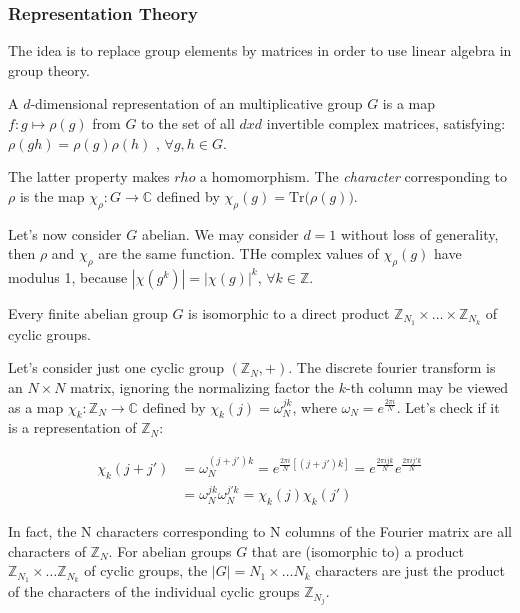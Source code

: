 \subsubsection{Representation Theory}
\label{Subsubsec: Representation Theory}

The idea is to replace group elements by matrices in order to use linear algebra in group theory.

\begin{definition}
A $d$-dimensional representation of an multiplicative group $G$ is a map $f: g \mapsto \rho(g)$ from $G$ to the set of all $dxd$ invertible complex matrices, satisfying: $\rho(gh) = \rho(g) \rho(h)$ , $\forall g,h \in G$.
\end{definition}

The latter property makes $rho$ a homomorphism. The \textit{character} corresponding to $\rho$ is the map $\chi_\rho : G \rightarrow \mathbb{C}$ defined by $\chi_\rho (g) = \text{Tr} \big( \rho(g) \big)$.

Let's now consider $G$ abelian. We may consider $d=1$ without loss of generality, then $\rho$ and $\chi_\rho$ are the same function. THe complex values of $\chi_\rho(g)$ have modulus 1, because $| \chi(g^k)| = |\chi(g)|^k$, $\forall k \in \mathbb{Z}$.


\begin{theorem}
Every finite abelian group $G$ is isomorphic to a direct product $\mathbb{Z}_{N_1} \times \dots \times \mathbb{Z}_{N_k}$ of cyclic groups.
\end{theorem}

Let's consider just one cyclic group $(\mathbb{Z}_N, +)$. The discrete fourier transform is an $N \times N$ matrix, ignoring the normalizing factor the $k$-th column may be viewed as a map $\chi_k: \mathbb{Z}_N \rightarrow \mathbb{C}$ defined by $\chi_k(j) = \omega_N^{jk}$, where $\omega_N = e^{\frac{2 \pi i}{N}}$. Let's check if it is a representation of $\mathbb{Z}_N$:

\begin{equation*}
\begin{split}
    \chi_k (j + j') & = \omega_N^{(j + j')k} = e^{\frac{2 \pi i }{N} [(j + j') k]} =  e^{\frac{2 \pi i j k }{N}} e^{\frac{2 \pi i j' k }{N}} \\
    & = \omega_N^{jk}  \omega_N^{j'k} = \chi_k(j) \chi_k(j')
\end{split}
\end{equation*}

In fact, the N characters corresponding to N columns of the Fourier matrix are all characters of $\mathbb{Z}_N$. For abelian groups $G$ that are (isomorphic to) a product $\mathbb{Z}_{N_1} \times \dots \mathbb{Z}_{N_k}$ of cyclic groups, the $|G| = N_1 \times \dots N_k$ characters are just the product of the characters of the individual cyclic groups $\mathbb{Z}_{N_j}$.

